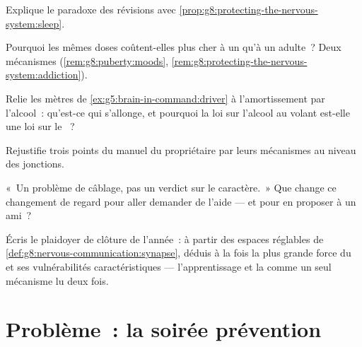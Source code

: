 \begin{exercise}[$\star\star$]\label{exo:g8:protecting-the-nervous-system:7}
Explique le paradoxe des révisions avec
\cref{prop:g8:protecting-the-nervous-system:sleep}.
\end{exercise}

\begin{exercise}[$\star\star$]\label{exo:g8:protecting-the-nervous-system:8}
Pourquoi les mêmes doses coûtent-elles plus cher à un
  qu'à un  adulte~? Deux mécanismes
(\cref{rem:g8:puberty:moods},
\cref{rem:g8:protecting-the-nervous-system:addiction}).
\end{exercise}

\begin{exercise}[$\star\star$]\label{exo:g8:protecting-the-nervous-system:9}
Relie les mètres de \cref{ex:g5:brain-in-command:driver} à
l'amortissement par l'alcool~: qu'est-ce qui s'allonge, et
pourquoi la loi sur l'alcool au volant est-elle une loi sur
le ~?
\end{exercise}

\begin{exercise}[$\star\star$]\label{exo:g8:protecting-the-nervous-system:10}
Rejustifie trois points du manuel du propriétaire par leurs
mécanismes au niveau des jonctions.
\end{exercise}

\begin{exercise}[$\star\star$]\label{exo:g8:protecting-the-nervous-system:11}
«~Un problème de câblage, pas un verdict sur le
caractère.~» Que change ce changement de regard pour aller
demander de l'aide --- et pour en proposer à un ami~?
\end{exercise}

\begin{exercise}[$\star\star\star$]\label{exo:g8:protecting-the-nervous-system:12}
Écris le plaidoyer de clôture de l'année~: à partir des
espaces réglables de
\cref{def:g8:nervous-communication:synapse}, déduis à la
fois la plus grande force du  et ses vulnérabilités
caractéristiques --- l'apprentissage et la 
comme un seul mécanisme lu deux fois.
\end{exercise}

\section{Problème~: la soirée prévention}

